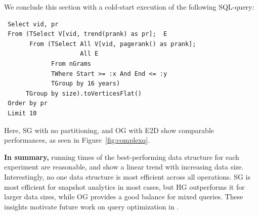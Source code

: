 
We conclude this section with a cold-start execution of
the following SQL-\ql query:

\begin{small}
\begin{verbatim}
 Select vid, pr
 From (TSelect V[vid, trend(prank) as pr];  E
       From (TSelect All V[vid, pagerank() as prank]; 
                     All E
             From nGrams
             TWhere Start >= :x And End <= :y
             TGroup by 16 years)
      TGroup by size).toVerticesFlat()
 Order by pr
 Limit 10
\end{verbatim}
\end{small}


Here, SG with no partitioning, and OG with E2D show comparable
performances, as seen in Figure~\ref{fig:complexq}.


{\bf In summary,} running times of the best-performing data structure
for each experiment are reasonable, and show a linear trend with
increasing data size.  Interestingly, no one data structure is most
efficient across all operations.    SG is most efficient for snapshot
analytics in most cases, but HG outperforms it for larger data sizes,
while OG provides a good balance for mixed queries.  These insights
motivate future work on query optimization in \ql.

